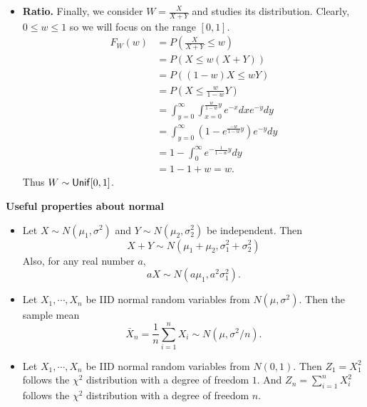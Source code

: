 \documentclass[twoside]{article}
\begin{document}
\begin{itemize}
\item {\bf Ratio.} 
Finally, we consider 
$
W = \frac{X}{X+Y}
$
and studies its distribution.
Clearly, $0\leq w\leq 1$ so we will focus on the range $[0,1]$.
\begin{align*}
F_W(w) & = P\left(\frac{X}{X+Y}\leq w\right)\\
& = P(X\leq w(X+Y))\\
& = P((1-w)X\leq wY)\\
& = P\left(X\leq \frac{w}{1-w} Y\right)\\
& = \int_{y=0}^\infty \int_{x=0}^{\frac{w}{1-w}y}e^{-x}dx e^{-y}dy\\
& = \int_{y=0}^\infty (1-e^{\frac{-w}{1-w}y}) e^{-y}dy\\
& = 1 -\int_0^\infty e^{-\frac{1}{1-w}y}dy\\
& = 1- 1+w = w. 
\end{align*}
Thus $W\sim {\sf Unif}[0,1]$.

\end{itemize}



{\bf Useful properties about normal}
\begin{itemize}
\item Let $X\sim N(\mu_1,\sigma^2)$ and $Y\sim N(\mu_2,\sigma_2^2)$ be independent.
Then 
$$
X+Y \sim N(\mu_1+\mu_2, \sigma_1^2+\sigma_2^2)
$$
Also, for any real number $a$,
$$
aX \sim N(a\mu_1, a^2 \sigma_1^2).
$$

\item Let $X_1,\cdots, X_n$ be IID normal random variables from $N(\mu,\sigma^2)$.
Then the sample mean
$$
\bar X_n = \frac{1}{n}\sum_{i=1}^n X_i\sim N(\mu,\sigma^2/n).
$$

\item Let $X_1,\cdots, X_n$ be IID normal random variables from $N(0,1)$.
Then $Z_1 = X_1^2$ follows the $\chi^2$ distribution with a degree of freedom $1$.
And $Z_n = \sum_{i=1}^n X_i^2$ follows the  $\chi^2$ distribution with a degree of freedom $n$.

\end{itemize}
\end{document}
